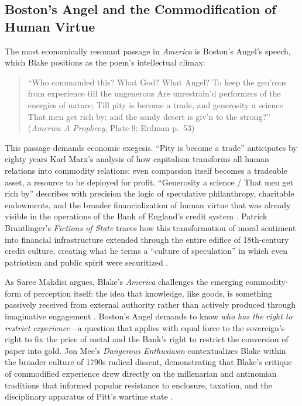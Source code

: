 \documentclass[
]{article}
\begin{document}
\subsection{Boston's Angel and the Commodification of Human
Virtue}\label{bostons-angel-and-the-commodification-of-human-virtue}

The most economically resonant passage in \emph{America} is Boston's
Angel's speech, which Blake positions as the poem's intellectual climax:

\begin{quote}
``Who commanded this? What God? What Angel? To keep the gen'rous from
experience till the ungenerous Are unrestrain'd performers of the
energies of nature; Till pity is become a trade, and generosity a
science That men get rich by; and the sandy desert is giv'n to the
strong?'' (\emph{America A Prophecy}, Plate 9; Erdman p.~53)
\citep{erdman1988complete, blake1793america}
\end{quote}

This passage demands economic exegesis. ``Pity is become a trade''
anticipates by eighty years Karl Marx's analysis of how capitalism
transforms all human relations into commodity relations: even compassion
itself becomes a tradeable asset, a resource to be deployed for profit.
``Generosity a science / That men get rich by'' describes with precision
the logic of speculative philanthropy, charitable endowments, and the
broader financialization of human virtue that was already visible in the
operations of the Bank of England's credit system
\citep{poovey2008genres}. Patrick Brantlinger's \emph{Fictions of State}
traces how this transformation of moral sentiment into financial
infrastructure extended through the entire edifice of 18th-century
credit culture, creating what he terms a ``culture of speculation'' in
which even patriotism and public spirit were securitized
\citep{brantlinger1996fictions}.

As Saree Makdisi argues, Blake's \emph{America} challenges the emerging
commodity-form of perception itself: the idea that knowledge, like
goods, is something passively received from external authority rather
than actively produced through imaginative engagement
\citep{makdisi2003william}. Boston's Angel demands to know \emph{who has
the right to restrict experience}---a question that applies with equal
force to the sovereign's right to fix the price of metal and the Bank's
right to restrict the conversion of paper into gold. Jon Mee's
\emph{Dangerous Enthusiasm} contextualizes Blake within the broader
culture of 1790s radical dissent, demonstrating that Blake's critique of
commodified experience drew directly on the millenarian and antinomian
traditions that informed popular resistance to enclosure, taxation, and
the disciplinary apparatus of Pitt's wartime state
\citep{mee1992dangerous}.
\end{document}
